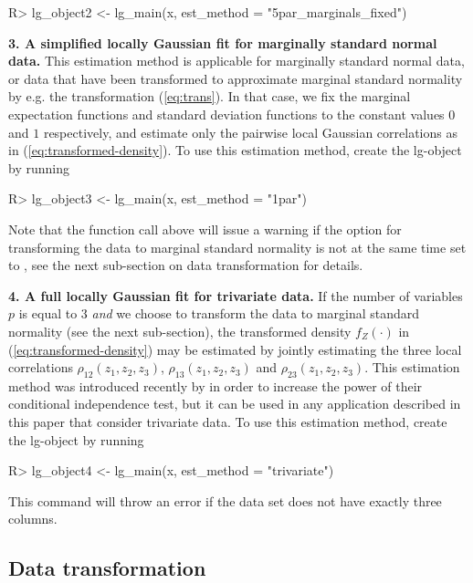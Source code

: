 \begin{example}
R> lg_object2 <- lg_main(x, est_method = "5par_marginals_fixed")
\end{example}

\textbf{3. A simplified locally Gaussian fit for marginally standard normal data.} This estimation method is applicable for marginally standard normal data, or data that have been transformed to approximate marginal standard normality by e.g. the transformation (\ref{eq:trans}). In that case, we fix the marginal expectation functions and standard deviation functions to the constant values $0$ and $1$ respectively, and estimate only the pairwise local Gaussian correlations as in (\ref{eq:transformed-density}). To use this estimation method, create the lg-object by running

\begin{example}
R> lg_object3 <- lg_main(x, est_method = "1par")
\end{example}

Note that the function call above will issue a warning if the option for transforming the data to marginal standard normality is not at the same time set to , see the next sub-section on data transformation for details.

\textbf{4. A full locally Gaussian fit for trivariate data.} If the number of variables $p$ is equal to $3$ \emph{and} we choose to transform the data to marginal standard normality (see the next sub-section), the transformed density $f_Z\left(\cdot\right)$ in (\ref{eq:transformed-density}) may be estimated by jointly estimating the three local correlations $\rho_{12}\left(z_1, z_2, z_3\right)$, $\rho_{13}\left(z_1, z_2, z_3\right)$ and $\rho_{23}\left(z_1, z_2, z_3\right)$. This estimation method was introduced recently by \cite{otne:tjos:2019} in order to increase the power of their conditional independence test, but it can be used in any application described in this paper that consider trivariate data. To use this estimation method, create the lg-object by running

\begin{example}
R> lg_object4 <- lg_main(x, est_method = "trivariate")
\end{example}
This command will throw an error if the data set  does not have exactly three columns.

\subsection{Data transformation}
\label{data-transformation}

